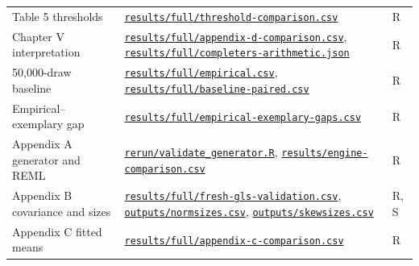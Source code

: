 \begin{longtable}{@{}L{.28\linewidth}L{.60\linewidth}l@{}}
Table 5 thresholds & \href{https://github.com/alectionary/vibe-math/blob/master/formalization/kupzyk-power-assumptions/results/full/threshold-comparison.csv}{\nolinkurl{results/full/threshold-comparison.csv}} & R \\
Chapter V interpretation & \href{https://github.com/alectionary/vibe-math/blob/master/formalization/kupzyk-power-assumptions/results/full/appendix-d-comparison.csv}{\nolinkurl{results/full/appendix-d-comparison.csv}}, \href{https://github.com/alectionary/vibe-math/blob/master/formalization/kupzyk-power-assumptions/results/full/completers-arithmetic.json}{\nolinkurl{results/full/completers-arithmetic.json}} & R \\
50,000-draw baseline & \href{https://github.com/alectionary/vibe-math/blob/master/formalization/kupzyk-power-assumptions/results/full/empirical.csv}{\nolinkurl{results/full/empirical.csv}}, \href{https://github.com/alectionary/vibe-math/blob/master/formalization/kupzyk-power-assumptions/results/full/baseline-paired.csv}{\nolinkurl{results/full/baseline-paired.csv}} & R \\
Empirical--exemplary gap & \href{https://github.com/alectionary/vibe-math/blob/master/formalization/kupzyk-power-assumptions/results/full/empirical-exemplary-gaps.csv}{\nolinkurl{results/full/empirical-exemplary-gaps.csv}} & R \\
Appendix A generator and REML & \href{https://github.com/alectionary/vibe-math/blob/master/formalization/kupzyk-power-assumptions/rerun/validate_generator.R}{\nolinkurl{rerun/validate_generator.R}}, \href{https://github.com/alectionary/vibe-math/blob/master/formalization/kupzyk-power-assumptions/results/engine-comparison.csv}{\nolinkurl{results/engine-comparison.csv}} & R \\
Appendix B covariance and sizes & \href{https://github.com/alectionary/vibe-math/blob/master/formalization/kupzyk-power-assumptions/results/full/fresh-gls-validation.csv}{\nolinkurl{results/full/fresh-gls-validation.csv}}, \href{https://github.com/alectionary/vibe-math/blob/master/formalization/kupzyk-power-assumptions/outputs/normsizes.csv}{\nolinkurl{outputs/normsizes.csv}}, \href{https://github.com/alectionary/vibe-math/blob/master/formalization/kupzyk-power-assumptions/outputs/skewsizes.csv}{\nolinkurl{outputs/skewsizes.csv}} & R, S \\
Appendix C fitted means & \href{https://github.com/alectionary/vibe-math/blob/master/formalization/kupzyk-power-assumptions/results/full/appendix-c-comparison.csv}{\nolinkurl{results/full/appendix-c-comparison.csv}} & R \\

\end{longtable}

